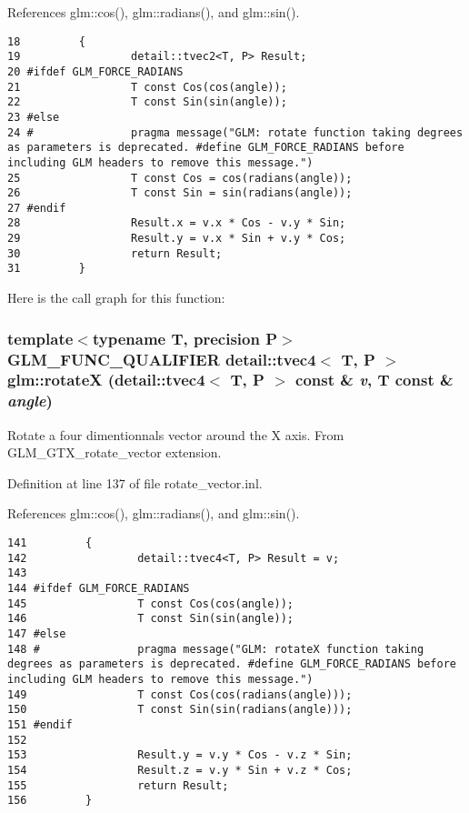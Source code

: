 References glm::cos(), glm::radians(), and glm::sin().

\begin{Code}\begin{verbatim}18         {
19                 detail::tvec2<T, P> Result;
20 #ifdef GLM_FORCE_RADIANS
21                 T const Cos(cos(angle));
22                 T const Sin(sin(angle));
23 #else
24 #               pragma message("GLM: rotate function taking degrees as parameters is deprecated. #define GLM_FORCE_RADIANS before including GLM headers to remove this message.")
25                 T const Cos = cos(radians(angle));
26                 T const Sin = sin(radians(angle));
27 #endif
28                 Result.x = v.x * Cos - v.y * Sin;
29                 Result.y = v.x * Sin + v.y * Cos;
30                 return Result;
31         }
\end{verbatim}
\end{Code}




Here is the call graph for this function:\hypertarget{group__gtx__rotate__vector_g846674e399c4106196405900ce78fe27}{
\subsubsection[rotateX]{\setlength{\rightskip}{0pt plus 5cm}template$<$typename T, precision P$>$ GLM\_\-FUNC\_\-QUALIFIER detail::tvec4$<$ T, P $>$ glm::rotateX (detail::tvec4$<$ T, P $>$ const \& {\em v}, \/  T const \& {\em angle})}}
\label{group__gtx__rotate__vector_g846674e399c4106196405900ce78fe27}


Rotate a four dimentionnals vector around the X axis. From GLM\_\-GTX\_\-rotate\_\-vector extension. 

Definition at line 137 of file rotate\_\-vector.inl.

References glm::cos(), glm::radians(), and glm::sin().

\begin{Code}\begin{verbatim}141         {
142                 detail::tvec4<T, P> Result = v;
143 
144 #ifdef GLM_FORCE_RADIANS
145                 T const Cos(cos(angle));
146                 T const Sin(sin(angle));
147 #else
148 #               pragma message("GLM: rotateX function taking degrees as parameters is deprecated. #define GLM_FORCE_RADIANS before including GLM headers to remove this message.")
149                 T const Cos(cos(radians(angle)));
150                 T const Sin(sin(radians(angle)));
151 #endif
152 
153                 Result.y = v.y * Cos - v.z * Sin;
154                 Result.z = v.y * Sin + v.z * Cos;
155                 return Result;
156         }
\end{verbatim}
\end{Code}




